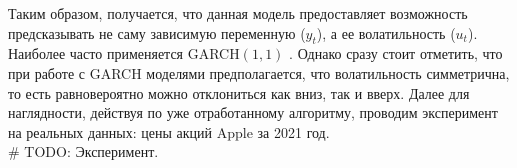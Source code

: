 Таким образом, получается, что данная модель предоставляет возможность предсказывать не саму зависимую переменную ($y_t$), а ее волатильность ($u_t$). Наиболее часто применяется GARCH$(1, 1)$ \cite{hansen2005forecast}. Однако сразу стоит отметить, что при работе с GARCH моделями предполагается, что волатильность симметрична, то есть равновероятно можно отклониться как вниз, так и вверх. Далее для наглядности, действуя по уже отработанному алгоритму, проводим эксперимент на реальных данных: цены акций Apple за 2021 год.\\

\noindent \# TODO: Эксперимент.